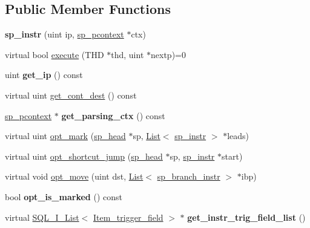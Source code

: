\subsection*{Public Member Functions}
\begin{DoxyCompactItemize}
\item 
\mbox{\label{classsp__instr_a0c98d931270bff1b6a8b659c380d28e3}} 
{\bfseries sp\+\_\+instr} (uint ip, \mbox{\hyperlink{classsp__pcontext}{sp\+\_\+pcontext}} $\ast$ctx)
\item 
virtual bool \mbox{\hyperlink{classsp__instr_a78add2ec1a98f8ba58d75c8eb40ed8cb}{execute}} (T\+HD $\ast$thd, uint $\ast$nextp)=0
\item 
\mbox{\label{classsp__instr_a9a790d7ec0b785fba0366c20832da6e5}} 
uint {\bfseries get\+\_\+ip} () const
\item 
virtual uint \mbox{\hyperlink{classsp__instr_a3430a1d05e78933479736c452d555b1e}{get\+\_\+cont\+\_\+dest}} () const
\item 
\mbox{\label{classsp__instr_af61dca8b776e76db1db64963039b372b}} 
\mbox{\hyperlink{classsp__pcontext}{sp\+\_\+pcontext}} $\ast$ {\bfseries get\+\_\+parsing\+\_\+ctx} () const
\item 
virtual uint \mbox{\hyperlink{classsp__instr_a10b7b33a30316fca4cff5adfe98e282c}{opt\+\_\+mark}} (\mbox{\hyperlink{classsp__head}{sp\+\_\+head}} $\ast$sp, \mbox{\hyperlink{classList}{List}}$<$ \mbox{\hyperlink{classsp__instr}{sp\+\_\+instr}} $>$ $\ast$leads)
\item 
virtual uint \mbox{\hyperlink{classsp__instr_aa06a5e2fcf128a0ed13e802b11efaba0}{opt\+\_\+shortcut\+\_\+jump}} (\mbox{\hyperlink{classsp__head}{sp\+\_\+head}} $\ast$sp, \mbox{\hyperlink{classsp__instr}{sp\+\_\+instr}} $\ast$start)
\item 
virtual void \mbox{\hyperlink{classsp__instr_a7b73990576fc8cd3f4a8bd16003ab44b}{opt\+\_\+move}} (uint dst, \mbox{\hyperlink{classList}{List}}$<$ \mbox{\hyperlink{classsp__branch__instr}{sp\+\_\+branch\+\_\+instr}} $>$ $\ast$ibp)
\item 
\mbox{\label{classsp__instr_a33aa21fb52db6edec41e3c36f804e86c}} 
bool {\bfseries opt\+\_\+is\+\_\+marked} () const
\item 
\mbox{\label{classsp__instr_a1c1c04446eba26a1ba596b8a50e63661}} 
virtual \mbox{\hyperlink{classSQL__I__List}{S\+Q\+L\+\_\+\+I\+\_\+\+List}}$<$ \mbox{\hyperlink{classItem__trigger__field}{Item\+\_\+trigger\+\_\+field}} $>$ $\ast$ {\bfseries get\+\_\+instr\+\_\+trig\+\_\+field\+\_\+list} ()
\end{DoxyCompactItemize}
